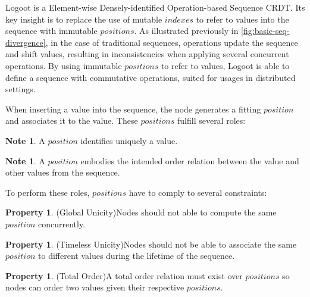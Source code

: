 \documentclass{article}
\theoremstyle{definition}
\newcounter{note-counter}
\theoremstyle{definition}
\newtheorem{note}[note-counter]{Note}
\newcounter{property-counter}
\theoremstyle{definition}
\newtheorem{property}[property-counter]{Property}
\begin{document}
Logoot is a Element-wise Densely-identified Operation-based Sequence \ac{CRDT}.
Its key insight is to replace the use of mutable $indexes$ to refer to values into the sequence with immutable $positions$.
As illustrated previously in \autoref{fig:basic-seq-divergence}, in the case of traditional sequences, operations update the sequence and shift values, resulting in inconsistencies when applying several concurrent operations.
By using immutable $positions$ to refer to values, Logoot is able to define a sequence with commutative operations, suited for usages in distributed settings.

When inserting a value into the sequence, the node generates a fitting $position$ and associates it to the value.
These $positions$ fulfill several roles:

\begin{note}
    A $position$ identifies uniquely a value.
\end{note}

\begin{note}
    A $position$ embodies the intended order relation between the value and other values from the sequence.
\end{note}


To perform these roles, $positions$ have to comply to several constraints:

\begin{property}(Global Unicity)\label{prop:global-unicity}
    Nodes should not able to compute the same $position$ concurrently.
\end{property}

\begin{property}(Timeless Unicity)\label{prop:timeless-unicity}
    Nodes should not be able to associate the same $position$ to different values during the lifetime of the sequence.
\end{property}

\begin{property}(Total Order)\label{prop:total-order}
    A total order relation must exist over $positions$ so nodes can order two values given their respective $positions$.
\end{property}
\end{document}
